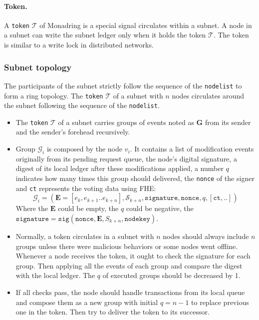\documentclass[11pt]{article}
\begin{document}
\paragraph{Token.} A \texttt{token} $\mathcal{T}$ of Monadring is a special signal circulates within a subnet.
A node in a subnet can write the subnet ledger only when it holds the token $\mathcal{T}$. The token is similar to a write lock in distributed networks.

\subsubsection{Subnet topology}
\label{sec:subnet_topology}
The participants of the subnet strictly follow the sequence of the \texttt{nodelist} to form a ring topology.
The \texttt{token} $\mathcal{T}$ of a subnet with $n$ nodes circulates around the subnet following the sequence of the \texttt{nodelist}.

\begin{itemize}
\item The \texttt{token} $\mathcal{T}$ of a subnet carries groups of events noted as $\mathbf{G}$ from its sender and the sender{'}s forehead recursively.
\item Group $\mathcal{G}_{i}$ is composed by the node $v_{i}$. It contains a list of modification events originally from its pending request queue, the node{'}s digital signature, a digest of its local ledger after these modifications applied, a number $q$ indicates how many times this group should delivered, the \texttt{nonce} of the signer and \texttt{ct} represents the voting data using FHE:
\begin{equation}
\mathcal{G}_{i} = (\mathbf{E} = [e_{k}, e_{k+1}..e_{k+n}], \mathcal{S}_{k+n}, \texttt{signature}, \texttt{nonce}, q, [\texttt{ct},..])
\end{equation}
Where the $\mathbf{E}$ could be empty, the $q$ could be negative, the \(\texttt{signature} = \texttt{sig}(\texttt{nonce}, \mathbf{E}, S_{k+n}, \texttt{nodekey})\).

\item Normally, a token circulates in a subnet with $n$ nodes should always include $n$ groups unless there were malicious behaviors or some nodes went offline.
Whenever a node receives the token, it ought to check the signature for each group.
Then applying all the events of each group and compare the digest with the local ledger.
The $q$ of executed groups should be decreased by 1.

\item If all checks pass, the node should handle transactions from its local queue and compose them as a new group with initial $q=n-1$ to replace previous one in the token.
Then try to deliver the token to its successor.
\end{itemize}
\end{document}
